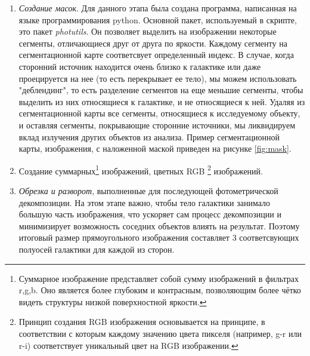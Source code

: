 \begin{enumerate}
    \item \textit{Создание масок}. Для данного этапа была создана программа, написанная на языке программирования python. Основной пакет, используемый в скрипте, это пакет \textit{photutils}. Он позволяет выделить на изображении некоторые сегменты, отличающиеся друг от друга по яркости. Каждому сегменту на сегментационной карте соответсвует определенный индекс. В случае, когда сторонний источник находится очень близко к галактике или даже проецируется на нее (то есть перекрывает ее тело), мы можем использовать "деблендинг", то есть разделение сегментов на еще меньшие сегменты, чтобы выделить из них относящиеся к галактике, и не относящиеся к ней. Удаляя из сегментационной карты все сегменты, относящиеся к исследуемому объекту, и оставляя сегменты, покрывающие сторонние источники, мы ликвидируем вклад излучения других объектов из анализа. Пример сегментационной карты, изображения, с наложенной маской приведен на рисунке \ref{fig:mask}.
    \item Создание суммарных\footnote{Суммарное изображение представляет собой сумму изображений в фильтрах r,g,b. Оно является более глубоким и контрасным, позволяющим более чётко видеть структуры низкой поверхностной яркости.} изображений, цветных RGB \footnote{Принцип создания RGB изображения основывается на принципе, в соответствии с которым каждому значению цвета пикселя (например, g-r или r-i) соответствует уникальный цвет на RGB изображении.} изображений.
    \item \textit{Обрезка и разворот}, выполненные для последующей фотометрической декомпозиции. На этом этапе важно, чтобы тело галактики занимало большую часть изображения, что ускоряет сам процесс декомпозиции и минимизирует возможность соседних объектов влиять на результат. Поэтому итоговый размер прямоугольного изображения составляет 3 соответсвующих полуосей галактики для каждой из сторон.
\end{enumerate}

